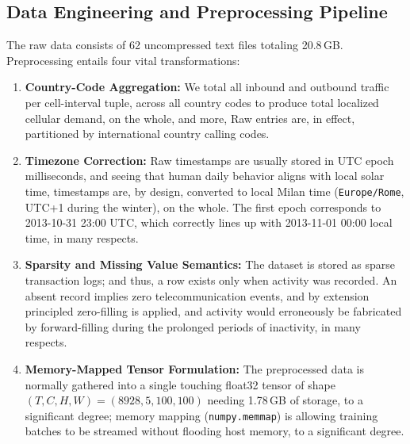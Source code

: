\documentclass[conference]{IEEEtran}
\begin{document}
\subsection{Data Engineering and Preprocessing Pipeline}
The raw data consists of 62 uncompressed text files totaling 20.8\,GB. Preprocessing entails four vital transformations:
\begin{enumerate}
    \item \textbf{Country-Code Aggregation:} We total all inbound and outbound traffic per cell-interval tuple, across all country codes to produce total localized cellular demand, on the whole, and more, Raw entries are, in effect, partitioned by international country calling codes.
    \item \textbf{Timezone Correction:} Raw timestamps are usually stored in UTC epoch milliseconds, and seeing that human daily behavior aligns with local solar time, timestamps are, by design, converted to local Milan time (\texttt{Europe/Rome}, UTC+1 during the winter), on the whole. The first epoch corresponds to 2013-10-31 23:00 UTC, which correctly lines up with 2013-11-01 00:00 local time, in many respects.
    \item \textbf{Sparsity and Missing Value Semantics:} The dataset is stored as sparse transaction logs; and thus, a row exists only when activity was recorded. An absent record implies zero telecommunication events, and by extension principled zero-filling is applied, and activity would erroneously be fabricated by forward-filling during the prolonged periods of inactivity, in many respects.
    \item \textbf{Memory-Mapped Tensor Formulation:} The preprocessed data is normally gathered into a single touching float32 tensor of shape $(T, C, H, W) = (8928, 5, 100, 100)$ needing 1.78\,GB of storage, to a significant degree; memory mapping (\texttt{numpy.memmap}) is allowing training batches to be streamed without flooding host memory, to a significant degree.
\end{enumerate}
\end{document}

